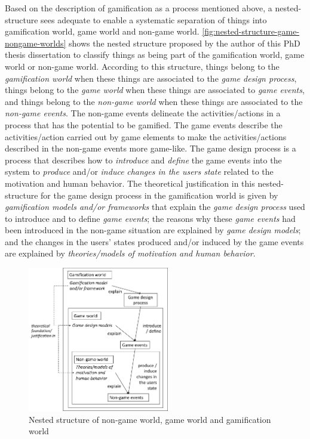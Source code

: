 Based on the description of gamification as a process mentioned above, a nested-structure sees adequate to enable a systematic separation of things into gamification world, game world and non-game world.
\autoref{fig:nested-structure-game-nongame-worlds} shows the nested structure proposed by the author of this PhD thesis dissertation to classify things as being part of the gamification world, game world or non-game world.
According to this structure, things belong to the \emph{gamification world} when these things are associated to the \emph{game design process}, things belong to the \emph{game world} when these things are associated to \emph{game events}, and things belong to the \emph{non-game world} when these things are associated to the \emph{non-game events}.
The non-game events delineate the activities/actions in a process that has the potential to be gamified.
The game events describe the activities/action carried out by game elements to make the activities/actions described in the non-game events more game-like.
The game design process is a process that describes how to \emph{introduce} and \emph{define} the game events into the system to \emph{produce} and/or \emph{induce} \emph{changes in the users state} related to the motivation and human behavior.
The theoretical justification in this nested-structure for the game design process in the gamification world is given by \emph{gamification models and/or frameworks} that explain the \emph{game design process} used to introduce and to define \emph{game events}; the reasons why these \emph{game events} had been introduced in the non-game situation are explained by \emph{game design models}; and the changes in the users' states produced and/or induced by the game events are explained by \emph{theories/models of motivation and human behavior}.

\begin{figure}[!htb]
 \caption{Nested structure of non-game world, game world and gamification world}
 \label{fig:nested-structure-game-nongame-worlds}
 \centering
 \includegraphics[width=0.55\textwidth]{images/chap-ontogacles2/nested-structure-game-nongame-worlds.png}
 \fautor
\end{figure}

